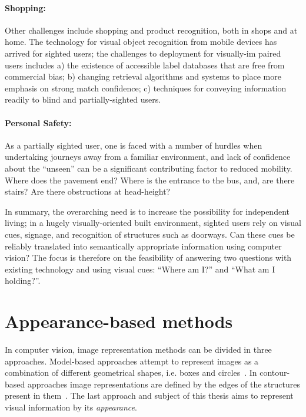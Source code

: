 \paragraph{Shopping:} Other challenges include shopping and product recognition, both in shops and at home. The technology for visual object recognition from mobile devices has arrived for sighted users; the challenges to deployment for visually\--im\-	paired users includes a) the existence of accessible label da\-ta\-ba\-ses that are free from commercial bias; b) changing retrieval algorithms and systems to place more emphasis on strong match confidence; c) techniques for conveying information readily to blind and partially-sighted users.

\paragraph{Personal Safety:} As a partially sighted user, one is faced with a number of hurdles when undertaking journeys away from a familiar environment, and lack of confidence about the ``unseen'' can be a significant contributing factor to reduced mobility.  Where does the pavement end?  Where is the entrance to the bus, and, are there stairs?  Are there obstructions at head-height?   

In summary, the overarching need is to increase the possibility for independent living; in a hugely visually-oriented built environment, sighted users rely on visual cues, signage, and recognition of structures such as doorways.  Can these cues be reliably translated into semantically appropriate information using computer vision? The focus is therefore on the feasibility of answering two questions with existing technology and using visual cues: ``Where am I?'' and ``What am I holding?''. 


\section{Appearance-based methods}

In computer vision, image representation methods can be divided in three approaches. Model-based approaches attempt to represent images as a combination of different geometrical shapes, i.e. boxes and circles~\cite{biederman1987recognition}. In contour-based approaches image representations are defined by the edges of the structures present in them~\cite{canny1986computational}. The last approach and subject of this thesis aims to represent visual information by its \textit{appearance}. 

